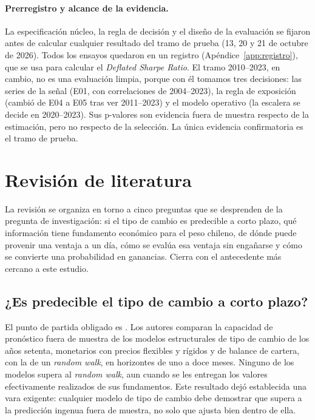 \documentclass[11pt,a4paper]{article}
\begin{document}
\paragraph{Prerregistro y alcance de la evidencia.} La especificación núcleo, la regla de decisión y el diseño de la evaluación se fijaron antes de calcular cualquier resultado del tramo de prueba (13, 20 y 21 de octubre de 2026). Todos los ensayos quedaron en un registro (Apéndice~\ref{app:registro}), que se usa para calcular el \emph{Deflated Sharpe Ratio}. El tramo 2010--2023, en cambio, no es una evaluación limpia, porque con él tomamos tres decisiones: las series de la señal (E01, con correlaciones de 2004--2023), la regla de exposición (cambió de E04 a E05 tras ver 2011--2023) y el modelo operativo (la escalera se decide en 2020--2023). Sus p-valores son evidencia fuera de muestra respecto de la estimación, pero no respecto de la selección. La única evidencia confirmatoria es el tramo de prueba.

\section{Revisión de literatura}\label{sec:literatura}

La revisión se organiza en torno a cinco preguntas que se desprenden de la pregunta de investigación: si el tipo de cambio es predecible a corto plazo, qué información tiene fundamento económico para el peso chileno, de dónde puede provenir una ventaja a un día, cómo se evalúa esa ventaja sin engañarse y cómo se convierte una probabilidad en ganancias. Cierra con el antecedente más cercano a este estudio.

\subsection{¿Es predecible el tipo de cambio a corto plazo?}

El punto de partida obligado es \citet{meese1983}. Los autores comparan la capacidad de pronóstico fuera de muestra de los modelos estructurales de tipo de cambio de los años setenta, monetarios con precios flexibles y rígidos y de balance de cartera, con la de un \emph{random walk}, en horizontes de uno a doce meses. Ninguno de los modelos supera al \emph{random walk}, aun cuando se les entregan los valores efectivamente realizados de sus fundamentos. Este resultado dejó establecida una vara exigente: cualquier modelo de tipo de cambio debe demostrar que supera a la predicción ingenua fuera de muestra, no solo que ajusta bien dentro de ella.
\end{document}
